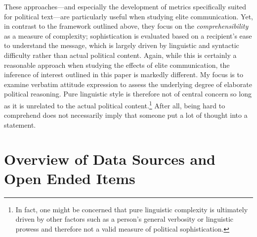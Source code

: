 These approaches---and especially the development of metrics specifically suited for political text---are particularly useful when studying elite communication. Yet, in contrast to the framework outlined above, they focus on the \textit{comprehensibility} as a measure of complexity; sophistication is evaluated based on a recipient's ease to understand the message, which is largely driven by linguistic and syntactic difficulty rather than actual political content. Again, while this is certainly a reasonable approach when studying the effects of elite communication, the inference of interest outlined in this paper is markedly different. My focus is to examine verbatim attitude expression to assess the underlying degree of elaborate political reasoning. Pure linguistic style is therefore not of central concern so long as it is unrelated to the actual political content.\footnote{In fact, one might be concerned that pure linguistic complexity is ultimately driven by other factors such as a person's general verbosity or linguistic prowess and therefore not a valid measure of political sophistication.} After all, being hard to comprehend does not necessarily imply that someone put a lot of thought into a statement.


\section*{Overview of Data Sources and Open Ended Items}

